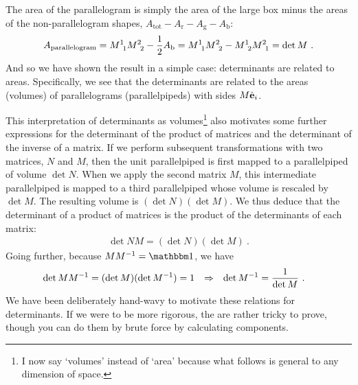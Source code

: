 \documentclass[12pt, oneside]{report}    %
\begin{document}
% 
The area of the parallelogram is simply the area of the large box minus the areas of the non-parallelogram shapes, $A_\text{tot}- A_\text{r} - A_\text{g} - A_\text{b}$:
\begin{align}
    A_\text{parallelogram} =  M\aij 11 M\aij 22 - \frac 12 A_\text{b}  = M\aij 11 M\aij 22  - M\aij 12 M\aij 21  = \det M \ .
    \label{eq:det:is:area:parallelogram}
\end{align}
And so we have shown the result in a simple case: determinants are related to areas. Specifically, we see that the determinants are related to the areas (volumes) of parallelograms (parallelpipeds) with sides $M\hat{\mathbf{e}}_i$. 

This interpretation of determinants as volumes\footnote{I now say `volumes' instead of `area' because what follows is general to any dimension of space.} also motivates some further expressions for the determinant of the product of matrices and the determinant of the inverse of a matrix. If we perform subsequent transformations with two matrices, $N$ and $M$, then the unit parallelpiped is first mapped to a parallelpiped of volume $\det N$. When we apply the second matrix $M$, this intermediate parallelpiped is mapped to a third parallelpiped whose volume is rescaled by $\det M$. The resulting volume is $(\det N)(\det M)$. We thus deduce that the determinant of a product of matrices is the product of the determinants of each matrix:
\begin{align}
    \det NM = (\det N)(\det M) \ . 
    \label{eq:det:of:product}
\end{align}
Going further, because $M M\inv = \one$, we have
\begin{align}
    \det M M^{-1} &= (\det M)(\det M^{-1} ) 
    = 1 
    & \Rightarrow&
    &
     \det M^{-1} &= \frac{1}{\det M} \ .
    \label{eq:det:of:inverse}
\end{align}
We have been deliberately hand-wavy to motivate these relations for determinants. If we were to be more rigorous, the are rather tricky to prove, though you can do them by brute force by calculating components.
\end{document}
